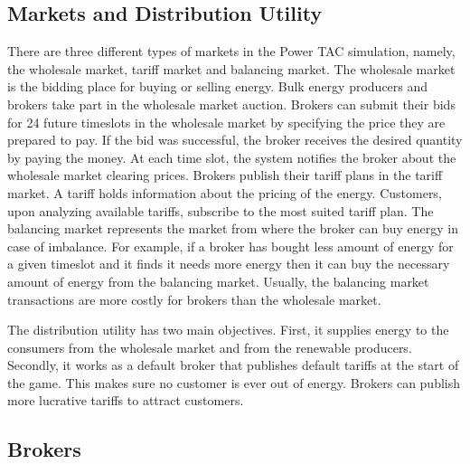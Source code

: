 \subsection{Markets and Distribution Utility}

There are three different types of markets in the Power TAC simulation, namely, the wholesale market, tariff market and balancing market. The wholesale market is the bidding place for buying or selling energy. Bulk energy producers and brokers take part in the wholesale market auction. Brokers can submit their bids for 24 future timeslots in the wholesale market by specifying the price they are prepared to pay. If the bid was successful, the broker receives the desired quantity by paying the money. At each time slot, the system notifies the broker about the wholesale market clearing prices. Brokers publish their tariff plans in the tariff market. A tariff holds information about the pricing of the energy. Customers, upon analyzing available tariffs, subscribe to the most suited tariff plan. The balancing market represents the market from where the broker can buy energy in case of imbalance. For example, if a broker has bought less amount of energy for a given timeslot and it finds it needs more energy then it can buy the necessary amount of energy from the balancing market. Usually, the balancing market transactions are more costly for brokers than the wholesale market.

The distribution utility has two main objectives. First, it supplies energy to the consumers from the wholesale market and from the renewable producers. Secondly, it works as a default broker that publishes default tariffs at the start of the game. This makes sure no customer is ever out of energy. Brokers can publish more lucrative tariffs to attract customers.

\subsection{Brokers}

